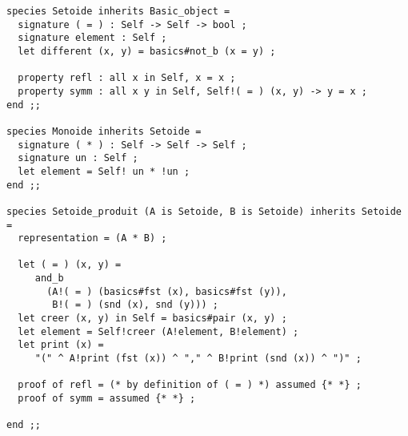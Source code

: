 {\footnotesize
\begin{lstlisting}
species Setoide inherits Basic_object =
  signature ( = ) : Self -> Self -> bool ;
  signature element : Self ;
  let different (x, y) = basics#not_b (x = y) ;

  property refl : all x in Self, x = x ;
  property symm : all x y in Self, Self!( = ) (x, y) -> y = x ;
end ;;

species Monoide inherits Setoide =
  signature ( * ) : Self -> Self -> Self ;
  signature un : Self ;
  let element = Self! un * !un ;
end ;;

species Setoide_produit (A is Setoide, B is Setoide) inherits Setoide =
  representation = (A * B) ;

  let ( = ) (x, y) =
     and_b
       (A!( = ) (basics#fst (x), basics#fst (y)),
        B!( = ) (snd (x), snd (y))) ;
  let creer (x, y) in Self = basics#pair (x, y) ;
  let element = Self!creer (A!element, B!element) ;
  let print (x) =
     "(" ^ A!print (fst (x)) ^ "," ^ B!print (snd (x)) ^ ")" ;

  proof of refl = (* by definition of ( = ) *) assumed {* *} ;
  proof of symm = assumed {* *} ;

end ;;
\end{lstlisting}}


